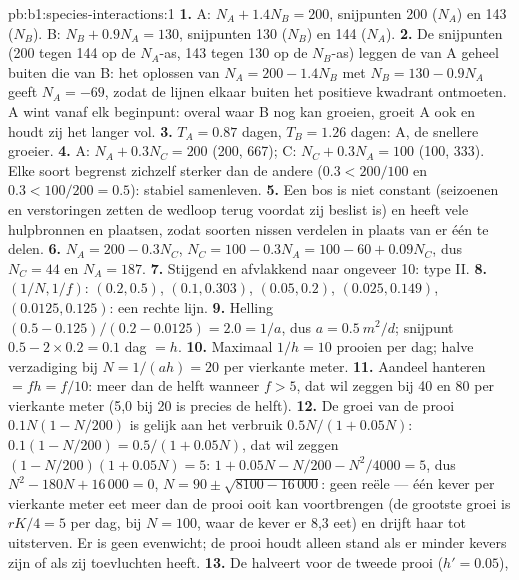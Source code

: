 \begin{solution}{pb:b1:species-interactions:1}
\textbf{1.} A: $N_A + 1.4 N_B = 200$, snijpunten 200 ($N_A$) en 143
($N_B$). B: $N_B + 0.9 N_A = 130$, snijpunten 130 ($N_B$) en 144
($N_A$).
\textbf{2.} De snijpunten (200 tegen 144 op de $N_A$-as, 143 tegen 130 op de
$N_B$-as) leggen de  van A geheel buiten die van B: het oplossen van
$N_A = 200 - 1.4 N_B$ met $N_B = 130 - 0.9 N_A$ geeft $N_A = -69$, zodat de
lijnen elkaar buiten het positieve kwadrant ontmoeten. A wint vanaf elk
beginpunt: overal waar B nog kan groeien, groeit A ook en houdt zij het
langer vol.
\textbf{3.} $T_A = 0.87$ dagen, $T_B = 1.26$ dagen: A, de snellere
groeier.
\textbf{4.} A: $N_A + 0.3 N_C = 200$ (200, 667); C: $N_C + 0.3 N_A =
100$ (100, 333). Elke soort begrenst zichzelf sterker dan de andere
($0.3 < 200/100$ en $0.3 < 100/200 = 0.5$): stabiel samenleven.
\textbf{5.} Een bos is niet constant (seizoenen en verstoringen zetten de
wedloop terug voordat zij beslist is) en heeft vele hulpbronnen en plaatsen,
zodat soorten nissen verdelen in plaats van er één te delen.
\textbf{6.} $N_A = 200 - 0.3 N_C$, $N_C = 100 - 0.3 N_A = 100 - 60 +
0.09 N_C$, dus $N_C = 44$ en $N_A = 187$.
\textbf{7.} Stijgend en afvlakkend naar ongeveer 10: type II.
\textbf{8.} $(1/N, 1/f)$: $(0.2, 0.5)$, $(0.1, 0.303)$, $(0.05, 0.2)$,
$(0.025, 0.149)$, $(0.0125, 0.125)$: een rechte lijn.
\textbf{9.} Helling $(0.5 - 0.125)/(0.2 - 0.0125) = 2.0 = 1/a$, dus $a =
\qty{0.5}{m^2/d}$; snijpunt $0.5 - 2\times 0.2 = 0.1$ dag $= h$.
\textbf{10.} Maximaal $1/h = 10$ prooien per dag; halve verzadiging bij $N =
1/(ah) = 20$ per vierkante meter.
\textbf{11.} Aandeel hanteren $= f h = f/10$: meer dan de helft wanneer $f
> 5$, dat wil zeggen bij 40 en 80 per vierkante meter (5,0 bij 20 is precies de helft).
\textbf{12.} De groei van de prooi $0.1 N (1 - N/200)$ is gelijk aan het
verbruik $0.5N/(1 + 0.05N)$: $0.1(1 - N/200) = 0.5/(1 + 0.05 N)$, dat wil zeggen
$(1 - N/200)(1 + 0.05N) = 5$: $1 + 0.05N - N/200 - N^2/4000 = 5$, dus
$N^2 - 180 N + 16\,000 = 0$, $N = 90 \pm \sqrt{8100 - 16\,000}$: geen
reële  --- één kever per vierkante meter eet meer dan de prooi ooit kan
voortbrengen (de grootste groei is $rK/4 = 5$ per dag, bij $N = 100$, waar
de kever er 8,3 eet) en drijft haar tot uitsterven. Er is geen evenwicht; de
prooi houdt alleen stand als er minder kevers zijn of als zij toevluchten heeft.
\textbf{13.} De  halveert voor de tweede prooi ($h' = 0.05$),

\end{solution}
